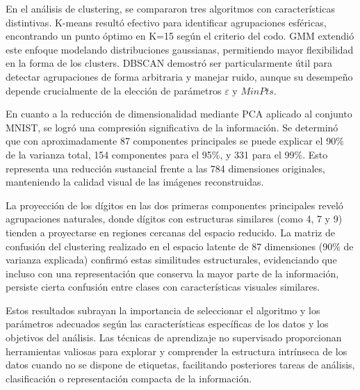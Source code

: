 \documentclass[11pt]{article}
\begin{document}
En el análisis de clustering, se compararon tres algoritmos con características distintivas. K-means resultó efectivo para identificar agrupaciones esféricas, encontrando un punto óptimo en K=15 según el criterio del codo. GMM extendió este enfoque modelando distribuciones gaussianas, permitiendo mayor flexibilidad en la forma de los clusters. DBSCAN demostró ser particularmente útil para detectar agrupaciones de forma arbitraria y manejar ruido, aunque su desempeño depende crucialmente de la elección de parámetros $\varepsilon$ y $MinPts$.

En cuanto a la reducción de dimensionalidad mediante PCA aplicado al conjunto MNIST, se logró una compresión significativa de la información. Se determinó que con aproximadamente 87 componentes principales se puede explicar el 90\% de la varianza total, 154 componentes para el 95\%, y 331 para el 99\%. Esto representa una reducción sustancial frente a las 784 dimensiones originales, manteniendo la calidad visual de las imágenes reconstruidas.

La proyección de los dígitos en las dos primeras componentes principales reveló agrupaciones naturales, donde dígitos con estructuras similares (como 4, 7 y 9) tienden a proyectarse en regiones cercanas del espacio reducido. La matriz de confusión del clustering realizado en el espacio latente de 87 dimensiones (90\% de varianza explicada) confirmó estas similitudes estructurales, evidenciando que incluso con una representación que conserva la mayor parte de la información, persiste cierta confusión entre clases con características visuales similares.

Estos resultados subrayan la importancia de seleccionar el algoritmo y los parámetros adecuados según las características específicas de los datos y los objetivos del análisis. Las técnicas de aprendizaje no supervisado proporcionan herramientas valiosas para explorar y comprender la estructura intrínseca de los datos cuando no se dispone de etiquetas, facilitando posteriores tareas de análisis, clasificación o representación compacta de la información.
\end{document}
